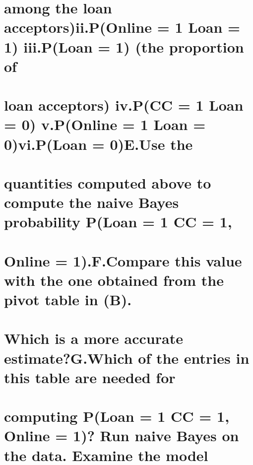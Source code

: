 \documentclass[
]{article}
\begin{document}
\hypertarget{among-the-loan-acceptorsii.ponline-1-loan-1-iii.ploan-1-the-proportion-of}{%
\section{among the loan acceptors)ii.P(Online = 1 \textbar{} Loan = 1)
iii.P(Loan = 1) (the proportion
of}\label{among-the-loan-acceptorsii.ponline-1-loan-1-iii.ploan-1-the-proportion-of}}

\hypertarget{loan-acceptors-iv.pcc-1-loan-0-v.ponline-1-loan-0vi.ploan-0e.use-the}{%
\section{loan acceptors) iv.P(CC = 1 \textbar{} Loan = 0) v.P(Online = 1
\textbar{} Loan = 0)vi.P(Loan = 0)E.Use
the}\label{loan-acceptors-iv.pcc-1-loan-0-v.ponline-1-loan-0vi.ploan-0e.use-the}}

\hypertarget{quantities-computed-above-to-compute-the-naive-bayes-probability-ploan-1-cc-1}{%
\section{quantities computed above to compute the naive Bayes
probability P(Loan = 1 \textbar{} CC =
1,}\label{quantities-computed-above-to-compute-the-naive-bayes-probability-ploan-1-cc-1}}

\hypertarget{online-1.f.compare-this-value-with-the-one-obtained-from-the-pivot-table-in-b.}{%
\section{Online = 1).F.Compare this value with the one obtained from the
pivot table in
(B).}\label{online-1.f.compare-this-value-with-the-one-obtained-from-the-pivot-table-in-b.}}

\hypertarget{which-is-a-more-accurate-estimateg.which-of-the-entries-in-this-table-are-needed-for}{%
\section{Which is a more accurate estimate?G.Which of the entries in
this table are needed
for}\label{which-is-a-more-accurate-estimateg.which-of-the-entries-in-this-table-are-needed-for}}

\hypertarget{computing-ploan-1-cc-1-online-1-run-naive-bayes-on-the-data.-examine-the-model}{%
\section{computing P(Loan = 1 \textbar{} CC = 1, Online = 1)? Run naive
Bayes on the data. Examine the
model}\label{computing-ploan-1-cc-1-online-1-run-naive-bayes-on-the-data.-examine-the-model}}
\end{document}

